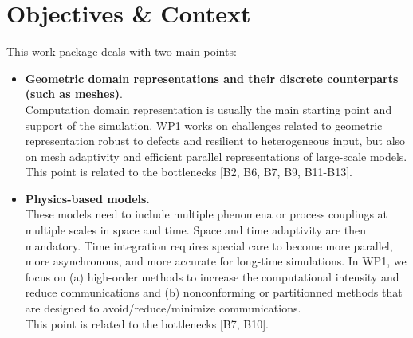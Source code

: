 
\section{Objectives \& Context}
This work package deals with two main points: 
\begin{itemize} 
\item {\bf Geometric domain representations and their discrete counterparts (such as meshes)}. \\
Computation domain representation is usually the main starting point and support of the simulation. WP1 works on challenges related to geometric representation robust to defects and resilient to heterogeneous input, but also on mesh adaptivity and efficient parallel representations of large-scale models.\\
This point is related to the bottlenecks [B2, B6, B7, B9, B11-B13]. 
\item {\bf Physics-based models.}\\
These models need to include multiple phenomena or process couplings at multiple
scales in space and time. Space and time adaptivity are then mandatory. Time integration requires special care to become more parallel, more asynchronous, and more accurate for long-time simulations. In WP1, we focus on (a) high-order methods to increase the
computational intensity and reduce communications and (b) nonconforming or partitionned methods that are
designed to avoid/reduce/minimize communications.\\
This point is related to the bottlenecks [B7, B10].
\end{itemize}

